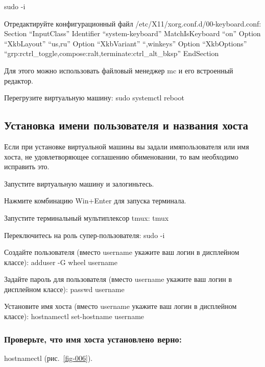 \documentclass[
  russian,
  letterpaper,
  DIV=11,
  numbers=noendperiod]{scrartcl}
\begin{document}
sudo -i

Отредактируйте конфигурационный файл
/etc/X11/xorg.conf.d/00-keyboard.conf: Section ``InputClass'' Identifier
``system-keyboard'' MatchIsKeyboard ``on'' Option ``XkbLayout''
``us,ru'' Option ``XkbVariant'' ``,winkeys'' Option ``XkbOptions''
``grp:rctrl\_toggle,compose:ralt,terminate:ctrl\_alt\_bksp'' EndSection

Для этого можно использовать файловый менеджер mc и его встроенный
редактор.

Перегрузите виртуальную машину: sudo systemctl reboot

\subsection{Установка имени пользователя и названия
хоста}\label{ux443ux441ux442ux430ux43dux43eux432ux43aux430-ux438ux43cux435ux43dux438-ux43fux43eux43bux44cux437ux43eux432ux430ux442ux435ux43bux44f-ux438-ux43dux430ux437ux432ux430ux43dux438ux44f-ux445ux43eux441ux442ux430}

Если при установке виртуальной машины вы задали имяпользователя или имя
хоста, не удовлетворяющее соглашению обименовании, то вам необходимо
исправить это.

Запустите виртуальную машину и залогиньтесь.

Нажмите комбинацию Win+Enter для запуска терминала.

Запустите терминальный мультиплексор tmux: tmux

Переключитесь на роль супер-пользователя: sudo -i

Создайте пользователя (вместо username укажите ваш логин в дисплейном
классе): adduser -G wheel username

Задайте пароль для пользователя (вместо username укажите ваш логин в
дисплейном классе): passwd username

Установите имя хоста (вместо username укажите ваш логин в дисплейном
классе): hostnamectl set-hostname username

\subsubsection{Проверьте, что имя хоста установлено
верно:}\label{ux43fux440ux43eux432ux435ux440ux44cux442ux435-ux447ux442ux43e-ux438ux43cux44f-ux445ux43eux441ux442ux430-ux443ux441ux442ux430ux43dux43eux432ux43bux435ux43dux43e-ux432ux435ux440ux43dux43e}

hostnamectl (рис.~\ref{fig-006}).
\end{document}

